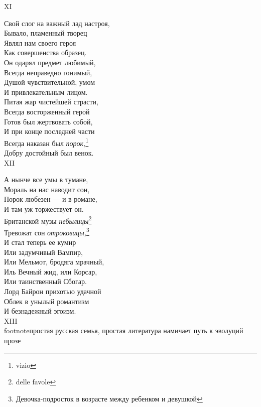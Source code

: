 XI

Свой слог на важный лад настроя,\\
Бывало, пламенный творец\\
Являл нам своего героя\\
Как совершенства образец.\\
Он одарял предмет любимый,\\
Всегда неправедно гонимый,\\
Душой чувствительной, умом\\
И привлекательным лицом.\\
Питая жар чистейшей страсти,\\
Всегда восторженный герой\\
Готов был жертвовать собой,\\
И при конце последней части\\
Всегда наказан был \emph{порок,}\footnote{vizio}\\
Добру достойный был венок.\\

XII

А нынче все умы в тумане,\\
Мораль на нас наводит сон,\\
Порок любезен — и в романе,\\
И там уж торжествует он.\\
Британской музы \emph{небылицы}\footnote{delle favole}\\
Тревожат сон \emph{отроковицы,}\footnote{Девочка-подросток в возрасте между ребенком и девушкой}\\
И стал теперь ее кумир\\
Или задумчивый Вампир,\\
Или Мельмот, бродяга мрачный,\\
Иль Вечный жид, или Корсар,\\
Или таинственный Сбогар.\\
Лорд Байрон прихотью удачной\\
Облек в унылый романтизм\\
И безнадежный эгоизм.\\

XIII\\footnote{простая русская семья, простая литература намичает путь к эволуций прозе}

